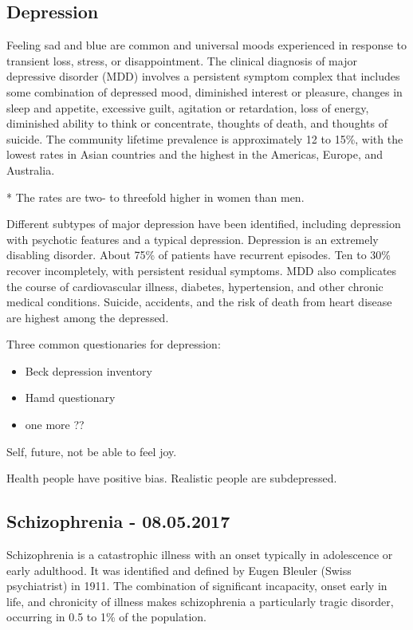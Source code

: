 \documentclass[12pt,article,oneside,a4paper]{memoir}
\begin{document}
\subsection{Depression}

Feeling sad and blue are common and universal moods experienced in response to
transient loss, stress, or disappointment. 
The clinical diagnosis of major depressive disorder (MDD) involves a persistent
symptom complex that includes some combination of depressed mood, diminished
interest or pleasure, changes in sleep and appetite, excessive guilt, agitation
or retardation, loss of energy, diminished ability to think or concentrate,
thoughts of death, and thoughts of suicide.
The community lifetime prevalence is approximately 12 to 15\%, with the lowest
rates in Asian countries and the highest in the Americas, Europe, and Australia.

* The rates are two- to threefold higher in women than men.

Different subtypes of major depression have been identified, including depression
with psychotic features and a typical depression.
Depression is an extremely disabling disorder. About 75\% of patients have
recurrent episodes. Ten to 30\% recover incompletely, with persistent residual
symptoms. MDD also complicates the course of cardiovascular illness, diabetes,
hypertension, and other chronic medical conditions. Suicide, accidents, and the
risk of death from heart disease are highest among the depressed. 

Three common questionaries for depression:
\begin{itemize}
\item Beck depression inventory
\item Hamd questionary
\item one more ??
\end{itemize}

Self, future, not be able to feel joy.

Health people have positive bias. Realistic people are subdepressed.

\newpage
\subsection{Schizophrenia - 08.05.2017}

Schizophrenia is a catastrophic illness with an onset typically in adolescence 
or early adulthood. It was identified and defined by Eugen Bleuler (Swiss 
psychiatrist) in 1911. The combination of significant incapacity, onset early 
in life, and chronicity of illness makes schizophrenia a particularly tragic 
disorder, occurring in 0.5 to 1\% of the population.
\end{document}
